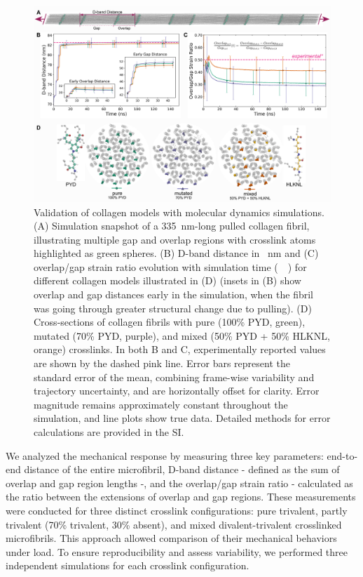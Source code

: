 \documentclass[10pt,letterpaper]{article}
\begin{document}
\begin{figure}[!t]
    \centering
    \includegraphics[width=\linewidth]{figures/simulations_validation.png}
    \caption{Validation of collagen models with molecular dynamics simulations. (A) Simulation snapshot of a \SI{335}{\nano\meter}-long pulled collagen fibril, illustrating multiple gap and overlap regions with crosslink atoms highlighted as green spheres. (B) D-band distance in \SI{}{\nano\meter} and (C) overlap/gap strain ratio evolution with simulation time (\SI{}{\nano\sec}) for different collagen models illustrated in (D) (insets in (B) show overlap and gap distances early in the simulation, when the fibril was going through greater structural change due to pulling). (D) Cross-sections of collagen fibrils with pure (100\% PYD, green), mutated (70\% PYD, purple), and mixed (50\% PYD + 50\% HLKNL, orange) crosslinks. In both B and C, experimentally reported values \cite{peacock2019nanomechanical} are shown by the dashed pink line. Error bars represent the standard error of the mean, combining frame-wise variability and trajectory uncertainty, and are horizontally offset for clarity. Error magnitude remains approximately constant throughout the simulation, and line plots show true data. Detailed methods for error calculations are provided in the SI.}
    \label{fig:simulations_results}
\end{figure}

We analyzed the mechanical response by measuring three key parameters: end-to-end distance of the entire microfibril, D-band distance - defined as the sum of overlap and gap region lengths -, and the overlap/gap strain ratio - calculated as the ratio between the extensions of overlap and gap regions. These measurements were conducted for three distinct crosslink configurations: pure trivalent, partly trivalent (70\% trivalent, 30\% absent), and mixed divalent-trivalent crosslinked microfibrils. This approach allowed comparison of their mechanical behaviors under load. To ensure reproducibility and assess variability, we performed three independent simulations for each crosslink configuration.
\end{document}
